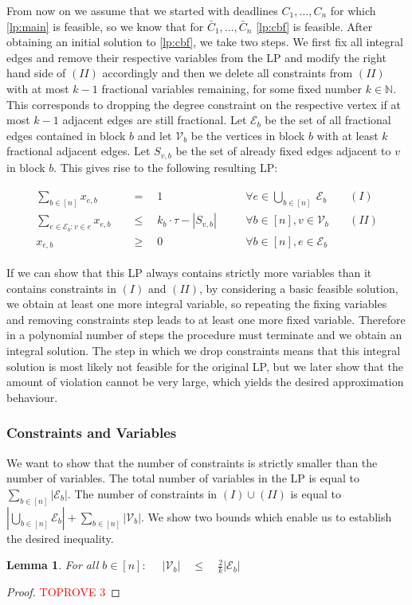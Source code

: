 \documentclass[11pt]{article}
\newtheorem{lemma}[theorem]{Lemma}
\begin{document}
From now on we assume that we started with deadlines $C_1,\dotsc,C_n$ for which \ref{lp:main} is feasible, so we know that for $\bar{C}_1,\dotsc,\bar{C}_n$ \ref{lp:cbf} is feasible. After obtaining an initial solution to \ref{lp:cbf}, we take two steps. We first fix all integral edges and remove their respective variables from the LP and modify the right hand side of $(II)$ accordingly and then we delete all constraints from $(II)$ with at most $k-1$ fractional variables remaining, for some fixed number $k \in \mathbb{N}$. This corresponds to dropping the degree constraint on the respective vertex if at most $k-1$ adjacent edges are still fractional. Let $\mathcal{E}_{b}$ be the set of all fractional edges contained in block $b$ and let $\mathcal{V}_{b}$ be the vertices in block $b$ with at least $k$ fractional adjacent edges. Let $S_{v,b}$ be the set of already fixed edges adjacent to $v$ in block $b$.
This gives rise to the following resulting LP:

\begin{gather*}
\begin{aligned}
\sum_{b \in [n]}x_{e,b} \quad &= \quad 1 &&\forall e \in \bigcup_{b \in [n]}\  \mathcal{E}_b& \quad(I)\\
\sum_{e \in \mathcal{E}_b: v \in e} x_{e,b} \quad&\le \quad k_b \cdot \tau - |S_{v,b}|\quad &&\forall b \in [n], v \in \mathcal{V}_b &\quad(II)\\
x_{e,b}\quad&\ge\quad 0 && \forall b \in [n], e \in \mathcal{E}_b
\end{aligned}
\end{gather*}

If we can show that this LP always contains strictly more variables than it contains constraints in $(I)$ and $(II)$, by considering a basic feasible solution, we obtain at least one more integral variable, so repeating the fixing variables and removing constraints step leads to at least one more fixed variable. Therefore in a polynomial number of steps the procedure must terminate and we obtain an integral solution. The step in which we drop constraints means that this integral solution is most likely not feasible for the original LP, but we later show that the amount of violation cannot be very large, which yields the desired approximation behaviour.

\subsubsection*{Constraints and Variables}
We want to show that the number of constraints is strictly smaller than the number of variables. The total number of variables in the LP is equal to $\sum_{b \in [n]}|\mathcal{E}_b|$. The number of constraints in $(I) \cup (II)$ is equal to $|\bigcup_{b \in [n]} \mathcal{E}_b| + \sum_{b \in [n]}|\mathcal{V}_b|$.
We show two bounds which enable us to establish the desired inequality.
\begin{lemma}
    For all $b \in [n]:$ $\quad|\mathcal{V}_b| \quad \le \quad \frac{2}{k}|\mathcal{E}_b|$
\end{lemma}
\begin{proof}\textcolor{red}{TOPROVE 3}\end{proof}
\end{document}
